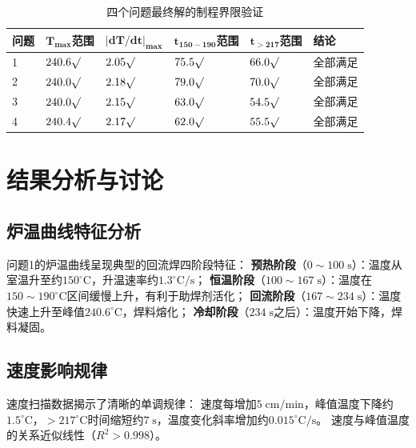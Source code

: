 \documentclass[12pt,a4paper]{ctexart}
\begin{document}
\begin{table}[H]
\centering
\footnotesize
\caption{四个问题最终解的制程界限验证}
\label{tab:constraints}
\begin{tabularx}{\textwidth}{YYYYYY}
\toprule
\textbf{问题} & $\boldsymbol{T_{\max}}$范围 & $\boldsymbol{|dT/dt|_{\max}}$ & $\boldsymbol{t_{150-190}}$范围 & $\boldsymbol{t_{>217}}$范围 & \textbf{结论} \\
 & $240.6\surd$ & $2.05\surd$ & $75.5\surd$ & $66.0\surd$ & 全部满足 \\
2 & $240.0\surd$ & $2.18\surd$ & $79.0\surd$ & $70.0\surd$ & 全部满足 \\
3 & $240.0\surd$ & $2.15\surd$ & $63.0\surd$ & $54.5\surd$ & 全部满足 \\
4 & $240.4\surd$ & $2.17\surd$ & $62.0\surd$ & $55.5\surd$ & 全部满足 \\
\bottomrule
\end{tabularx}
\end{table}

\section{结果分析与讨论}

\subsection{炉温曲线特征分析}

问题1的炉温曲线呈现典型的回流焊四阶段特征：
\textbf{预热阶段}（$0\sim100\;\mathrm{s}$）：温度从室温升至约$150^{\circ}\mathrm{C}$，升温速率约$1.3^{\circ}\mathrm{C}/\mathrm{s}$；
\textbf{恒温阶段}（$100\sim167\;\mathrm{s}$）：温度在$150\sim190^{\circ}\mathrm{C}$区间缓慢上升，有利于助焊剂活化；
\textbf{回流阶段}（$167\sim234\;\mathrm{s}$）：温度快速上升至峰值$240.6^{\circ}\mathrm{C}$，焊料熔化；
\textbf{冷却阶段}（$234\;\mathrm{s}$之后）：温度开始下降，焊料凝固。

\subsection{速度影响规律}

速度扫描数据揭示了清晰的单调规律：
速度每增加$5\;\mathrm{cm/min}$，峰值温度下降约$1.5^{\circ}\mathrm{C}$，$>$$217^{\circ}\mathrm{C}$时间缩短约$7\;\mathrm{s}$，温度变化斜率增加约$0.015^{\circ}\mathrm{C}/\mathrm{s}$。
速度与峰值温度的关系近似线性（$R^2>0.998$）。
\end{document}
